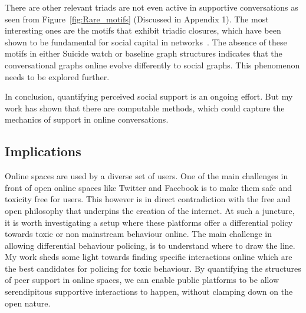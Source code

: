 There are other relevant triads are not even active in supportive conversations as seen from Figure~\ref{fig:Rare_motifs} (Discussed in Appendix 1). The most interesting ones are the motifs that exhibit triadic closures, which have been shown to be fundamental for social capital in networks~\cite{bianconi2014triadic,granovetter1977strength,jang2019crowd}. The absence of these motifs in either Suicide watch or baseline  graph structures indicates that the conversational graphs online evolve differently to social graphs. This phenomenon needs to be explored further.

In conclusion, quantifying perceived social support is an ongoing effort. But my work has shown that there are computable methods, which could capture the mechanics of support in online conversations.  

\subsection{Implications} 
Online spaces are used by a diverse set of users. One of the main challenges in front of open online spaces like Twitter and Facebook is to make them safe and toxicity free for users. 
This however is in direct contradiction with the free and open philosophy that underpins the creation of the internet. At such a juncture, it is worth investigating a setup where these platforms offer a differential policy towards toxic or non mainstream behaviour online. 
The main challenge in allowing differential behaviour policing, is to understand where to draw the line. My work sheds some light towards finding specific interactions online which are the best candidates for policing for toxic behaviour. By quantifying the structures of peer support in online spaces, we can enable public platforms to be allow serendipitous supportive interactions to happen, without clamping down on the open nature.








